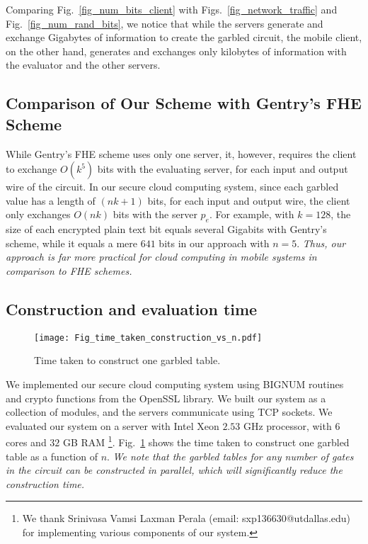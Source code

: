 \documentclass[10pt,journal,cspaper,compsoc]{IEEEtran}
\begin{document}
Comparing Fig.~\ref{fig_num_bits_client} with Figs.~\ref{fig_network_traffic} and Fig.~\ref{fig_num_rand_bits}, we notice that while the servers generate and exchange Gigabytes of information to create the garbled circuit, the mobile client, on the other hand, generates and exchanges only kilobytes of information with the evaluator and the other servers.


\subsection{Comparison of Our Scheme with Gentry's FHE Scheme}
While Gentry's FHE scheme \cite{gentry10} uses only one server, it, however, requires the client to exchange $O(k^5)$ bits with the evaluating server, for each input and output wire of the circuit. In our secure cloud computing system, since each garbled value has a length of $(nk+1)$ bits, for each input and output wire, the client only exchanges $O(nk)$ bits with the server $p_e$. For example, with $k=128$, the size of each encrypted plain text bit equals several Gigabits with Gentry's scheme, while it equals a mere $641$ bits in our approach with $n=5$. {\em Thus, our approach is far more practical for cloud computing in mobile systems in comparison to FHE schemes.}


\subsection{Construction and evaluation time}

\begin{figure}[t]
\centering
\texttt{[image: Fig\_time\_taken\_construction\_vs\_n.pdf]}
\vspace{-3 mm}
\caption{Time taken to construct one garbled table.\vspace{-2 mm}}
\label{fig_time_construction}
\end{figure}

We implemented our secure cloud computing system using BIGNUM routines and crypto functions from the OpenSSL library. We built our system as a collection of modules, and the servers communicate using TCP sockets. We evaluated our system on a server with Intel Xeon $2.53$ GHz processor, with $6$ cores and $32$ GB RAM \footnote{We thank Srinivasa Vamsi Laxman Perala (email: sxp136630@utdallas.edu) for implementing various components of our system.}. Fig.~\ref{fig_time_construction} shows the time taken to construct one garbled table as a function of $n$. {\em We note that the garbled tables for any number of gates in the circuit can be constructed in parallel, which will significantly reduce the construction time.}
\end{document}
